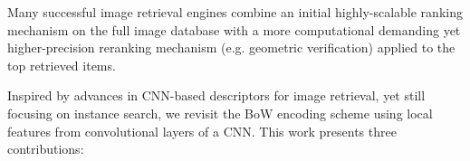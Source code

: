 \documentclass{sig-arxiv}
\begin{document}
Many successful image retrieval engines combine an initial highly-scalable ranking mechanism on the full image database with a more computational demanding yet higher-precision reranking mechanism (e.g. geometric verification) applied to the top retrieved items.


Inspired by advances in CNN-based descriptors for image retrieval, yet still focusing on instance search, we revisit the BoW encoding scheme using local features from convolutional layers of a CNN. 
This work presents three contributions: 
\end{document}
